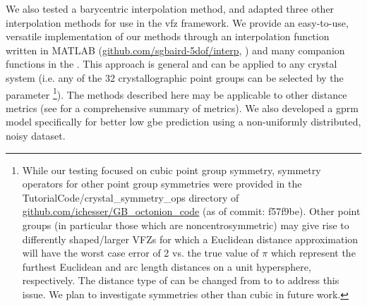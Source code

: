 \documentclass[final,twocolumn,12pt]{elsarticle}
\begin{document}
%
We also tested a barycentric interpolation method, and adapted three other interpolation methods for use in the \gls{vfz} framework. We provide an easy-to-use, versatile implementation of our methods through an interpolation function  written in MATLAB (\url{github.com/sgbaird-5dof/interp}, \cite{bairdFiveDegreeofFreedom5DOF2020}) and many companion functions in the \vfzorepo{}.  This approach is general and can be applied to any crystal system (i.e. any of the 32 crystallographic point groups can be selected by the parameter \footnote{While our testing focused on cubic point group symmetry, symmetry operators for other point group symmetries were provided in the TutorialCode/crystal\_symmetry\_ops directory of \url{github.com/ichesser/GB\_octonion\_code} (as of commit: f57f9be). Other point groups (in particular those which are noncentrosymmetric) may give rise to differently shaped/larger VFZs for which a Euclidean distance approximation will have the worst case error of 2 vs. the true value of $\pi$ which represent the furthest Euclidean and arc length distances on a unit hypersphere, respectively. The distance type of  can be changed from  to  to address this issue. We plan to investigate symmetries other than cubic in future work.}).
The methods described here may be applicable to other distance metrics (see \citet{morawiecDistancesGrainInterfaces2019} for a comprehensive summary of metrics). We also developed a \gls{gprm} model specifically for better low \gls{gbe} prediction using a non-uniformly distributed, noisy dataset.
\end{document}
